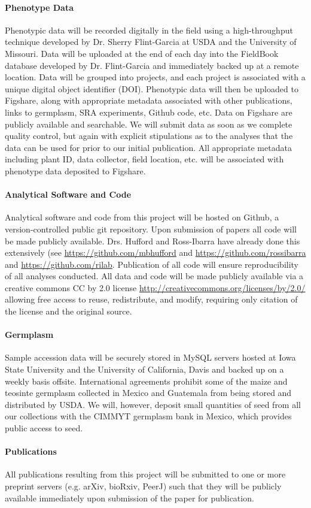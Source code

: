 \paragraph{Phenotype Data} 
Phenotypic data will be recorded digitally in the field using a high-throughput technique developed by Dr. Sherry Flint-Garcia at USDA and the University of Missouri.  Data will be uploaded at the end of each day into the FieldBook database developed by Dr. Flint-Garcia and immediately backed up at a remote location. Data will be grouped into projects, and each project is associated with a unique digital object identifier (DOI). Phenotypic data will then be uploaded to Figshare, along with appropriate metadata associated with other publications, links to germplasm, SRA experiments, Github code, etc.  Data on Figshare are publicly available and searchable.  We will submit data as soon as we complete quality control, but again with explicit stipulations as to the analyses that the data can be used for prior to our initial publication. All appropriate metadata including plant ID, data collector, field location, etc. will be associated with phenotype data deposited to Figshare. 

\paragraph{Analytical Software and Code} 
Analytical software and code from this project will be hosted on Github, a version-controlled public git repository.  Upon submission of papers all code will be made publicly available.  Drs. Hufford and Ross-Ibarra have already done this extensively (see \url{https://github.com/mbhufford} and \url{https://github.com/rossibarra} and \url{https://github.com/rilab}. Publication of all code will ensure reproducibility of all analyses conducted.  All data and code will be made publicly available via a creative commons CC by 2.0 license \url{http://creativecommons.org/licenses/by/2.0/} allowing free access to reuse, redistribute, and modify, requiring only citation of the license and the original source.

\paragraph{Germplasm} 
Sample accession data will be securely stored in MySQL servers hosted at Iowa State University and the University of California, Davis and backed up on a weekly basis offsite.  International agreements prohibit some of the maize and teosinte germplasm collected in Mexico and Guatemala from being stored and distributed by USDA.  We will, however, deposit small quantities of seed from all our collections with the CIMMYT germplasm bank in Mexico, which provides public access to seed.

\paragraph{Publications} 
All publications resulting from this project will be submitted to one or more preprint servers (e.g. arXiv, bioRxiv, PeerJ) such that they will be publicly available immediately upon submission of the paper for publication.



